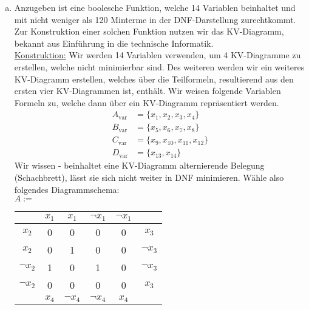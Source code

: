 \documentclass[a4paper,10pt]{article}
\begin{document}
\begin{enumerate}[a)]
\begin{proof}
\begin{align*}
x_j \wedge \bigwedge_{i=1, i \neq j}^n \neg x_i 
\end{align*}  
fehlen, und alle anderen Klauseln erlauben nur exakt eine Variable auf 1 zu setzen. Damit würde die Belegung, die nur $x_j$ auf 1 setzt $\phi$ nicht erfüllen, Widerspruch. Also hat $\phi$ doch mindestens $n$ Klauseln.
\end{proof}
Der Beweis zeigt, dass $n$ schon die kleinste mögliche Zahl an Klauseln für eine solche Formel ist, mehr sogar: der Beweis zeigt, dass die kanonische DNF die einzige DNF ist die keine unnötigen Klauseln enthält.
\item Anzugeben ist eine boolesche Funktion, welche 14 Variablen beinhaltet und mit nicht weniger als 120 Minterme in der DNF-Darstellung zurechtkommt. Zur Konstruktion einer solchen Funktion nutzen wir das KV-Diagramm, bekannt aus Einführung in die technische Informatik.\\
\underline{Konstruktion:} Wir werden 14 Variablen verwenden, um 4 KV-Diagramme zu erstellen, welche nicht minimierbar sind. Des weiteren werden wir ein weiteres KV-Diagramm erstellen, welches über die Teilformeln, resultierend aus den ersten vier KV-Diagrammen ist, enthält. Wir weisen folgende Variablen Formeln zu, welche dann über ein KV-Diagramm repräsentiert werden.
\begin{align*}
    A_{\text{var}} &= \{x_1,x_2,x_3,x_4\}\\
    B_{\text{var}} &= \{x_5,x_6,x_7,x_8\}\\
    C_{\text{var}} &= \{x_9,x_{10},x_{11},x_{12}\}\\
    D_{\text{var}} &= \{x_{13},x_{14}\}
\end{align*}
Wir wissen - beinhaltet eine KV-Diagramm alternierende Belegung (Schachbrett), lässt sie sich nicht weiter in DNF minimieren. Wähle also folgendes Diagrammschema:\\$A :=$
\begin{tabular}{|c|c|c|c|c|c|}
	\hline & $x_1$ & $x_1$ & $\neg x_1$ & $\neg x_1$ & \\
	\hline $x_2$ & 0 & 0 & 0 & 0 & $x_3$\\
	\hline $x_2$ &0 & 1 & 0 & 0 & $\neg x_3$\\
	\hline $\neg x_2$ & 1 & 0 & 1 & 0 & $\neg x_3$\\
	\hline $\neg x_2$& 0 & 0 & 0 & 0 & $x_3$\\
	\hline &$x_4$ &$\neg x_4$ & $\neg x_4$& $x_4$&\\
	\hline
\end{tabular}\\

\end{enumerate}
\end{document}
